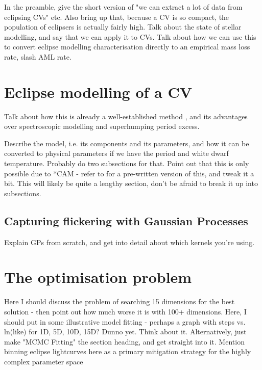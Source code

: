 \label{chpt:modelling and techniques} %


In the preamble, give the short version of "we can extract a lot of data from eclipsing CVs" etc.
Also bring up that, because a CV is so compact, the population of eclipsers is actually fairly high.
Talk about the state of stellar modelling, and say that we can apply it to CVs. Talk about how we can use this to convert eclipse modelling characterisation directly to an empirical mass loss rate, slash AML rate.


\section{Eclipse modelling of a CV}
\label{sect:method:lightcurve modelling}
Talk about how this is already a well-established method \citep{wood1986, Savoury2011, McAllister2017, McAllister2019}, and its advantages over spectroscopic modelling and superhumping period excess.

Describe the model, i.e. its components and its parameters, and how it can be converted to physical parameters if we have the period and white dwarf temperature. Probably do two subsections for that. Point out that this is only possible due to *CAM - refer to \citet{wild2021} for a pre-written version of this, and tweak it a bit. This will likely be quite a lengthy section, don't be afraid to break it up into subsections.

\subsection{Capturing flickering with Gaussian Processes}
Explain GPs from scratch, and get into detail about which kernels you're using. 

\section{The optimisation problem}
Here I should discuss the problem of searching 15 dimensions for the best solution - then point out how much worse it is with 100+ dimensions. Here, I should put in some illustrative model fitting - perhaps a graph with steps vs. ln(like) for 1D, 5D, 10D, 15D? Dunno yet. Think about it. Alternatively, just make "MCMC Fitting" the section heading, and get straight into it. Mention binning eclipse lightcurves here as a primary mitigation strategy for the highly complex parameter space

